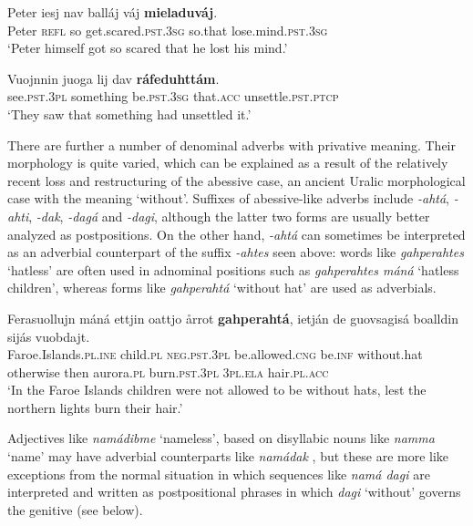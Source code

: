 \documentclass[output=paper,colorlinks,citecolor=brown]{langscibook}
\begin{document}
\ea\label{ex:lul:37} 
    \gll Peter iesj nav balláj váj \textbf{mieladuváj}. \\ 
         Peter \textsc{refl} so get.scared.\textsc{pst.3sg} so.that lose.mind.\textsc{pst.3sg} \\
    \glt ‘Peter himself got so scared that he lost his mind.’  \citep{SIKOR2021}
\z 

\ea\label{ex:lul:38} 
    \gll Vuojnnin juoga lij dav \textbf{ráfeduhttám}. \\ 
         see.\textsc{pst.3pl} something be.\textsc{pst.3sg} that\textsc{.acc} unsettle.\textsc{pst.ptcp} \\
    \glt  ‘They saw that something had unsettled it.’  \citep{SIKOR2021}
\z 

There are further a number of denominal adverbs with privative meaning. Their morphology is quite varied, which can be explained as a result of the relatively recent loss and restructuring of the abessive case, an ancient Uralic morphological case with the meaning ‘without’. Suffixes of abessive-like adverbs include \textit{{}-ahtá}, \textit{{}-ahti}, \textit{{}-dak}, \textit{{}-dagá} and \textit{{}-dagi}, although the latter two forms are usually better analyzed as postpositions. On the other hand, \textit{{}-ahtá} can sometimes be interpreted as an adverbial counterpart of the suffix \textit{{}-ahtes} seen above: words like \textit{gahperahtes} ‘hatless’ are often used in adnominal positions such as \textit{gahperahtes máná} ‘hatless children’, whereas forms like \textit{gahperahtá} ‘without hat’  are used as adverbials.

\ea\label{ex:lul:39} 
    \gll Ferasuollujn máná ettjin oattjo årrot \textbf{gahperahtá}, ietján de guovsagisá boalldin sijás vuobdajt.\\ 
         Faroe.Islands.\textsc{pl.ine} child.\textsc{pl} \textsc{neg.pst.3pl} be.allowed.\textsc{cng} be.\textsc{inf} without.hat otherwise then aurora.\textsc{pl} burn.\textsc{pst.3pl} \textsc{3pl.ela} hair.\textsc{pl.acc}\\
    \glt  ‘In the Faroe Islands children were not allowed to be without hats, lest the northern lights burn their hair.’  \citep{SIKOR2021}
\z 

Adjectives like \textit{namádibme} ‘nameless’, based on disyllabic nouns like \textit{namma} ‘name’ may have adverbial counterparts like \textit{namádak} , but these are more like exceptions from the normal situation in which sequences like \textit{namá dagi}  are interpreted and written as postpositional phrases in which \textit{dagi} ‘without’ governs the genitive (see below).
\end{document}
